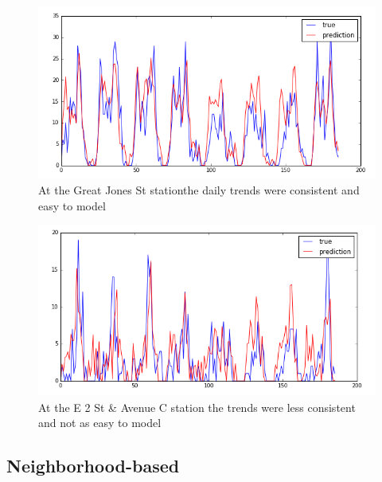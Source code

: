 \documentclass{proc}
\begin{document}
\begin{figure}[!hbt]
	\begin{center}
	\includegraphics[width=\columnwidth]{station_229ar.png}
	\caption{At the Great Jones St stationthe daily trends were consistent and easy to model}
	\end{center}
\end{figure}
\begin{figure}[!hbt]
	\begin{center}
	\includegraphics[width=\columnwidth]{station_150ar.png}
	\caption{At the E 2 St \& Avenue C station the trends were less consistent and not as easy to model}
	\end{center}
\end{figure}





\subsection{Neighborhood-based}
\end{document}

